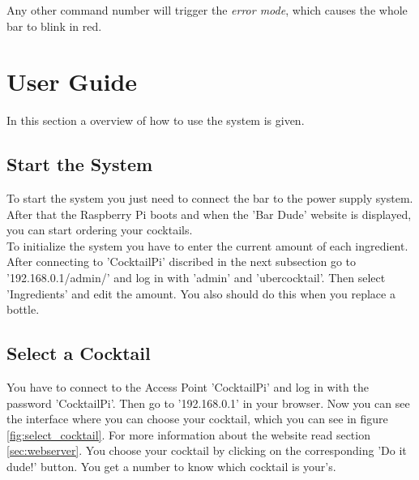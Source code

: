 \documentclass{acm_proc_article-sp}
\begin{document}
Any other command number will trigger the \textit{error mode}, which causes the whole bar to blink in red.

\section{User Guide}
In this section a overview of how to use the system is given.
\subsection{Start the System}
To start the system you just need to connect the bar to the power supply system. After that the Raspberry Pi boots and when the 'Bar Dude' website is displayed, you can start ordering your cocktails. \\
To initialize the system you have to enter the current amount of each ingredient. After connecting to 'CocktailPi' discribed in the next subsection go to '192.168.0.1/admin/' and log in with 'admin' and 'ubercocktail'. Then select 'Ingredients' and edit the amount. You also should do this when you replace a bottle.
 \subsection{Select a Cocktail}
You have to connect to the Access Point 'CocktailPi' and log in with the password 'CocktailPi'. Then go to '192.168.0.1' in your browser. Now you can see the interface where you can choose your cocktail, which you can see in figure \ref{fig:select_cocktail}. For more information about the website read section \ref{sec:webserver}. You choose your cocktail by clicking on the corresponding 'Do it dude!' button. You get a number to know which cocktail is your's.

\begin{minipage}{\linewidth}%
\label{fig:select_cocktail}%
\end{minipage}
\end{document}
